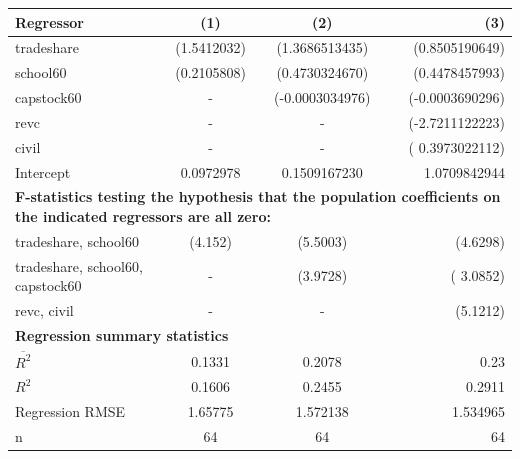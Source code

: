 \documentclass[12pt]{article}
\begin{document}
\begin{tabular}{| l | c | c |r |}
  \hline
  {\bf Regressor} & {\bf (1)} & {\bf (2)} & {\bf (3)}\\ \hline
  tradeshare & (1.5412032) & (1.3686513435) & (0.8505190649)\\ \hline
  school60 & (0.2105808) & (0.4730324670) & (0.4478457993)\\ \hline
  capstock60 & - & (-0.0003034976) & (-0.0003690296)\\ \hline
  revc & - & - & (-2.7211122223)\\ \hline
  civil & - & - & ( 0.3973022112)\\ \hline
  Intercept & 0.0972978 & 0.1509167230 & 1.0709842944 \\ \hline
  
   \multicolumn{4}{|p{15cm}|}{\bf F-statistics testing the hypothesis that the population coefficients on the indicated regressors are all zero:}  \\ \hline
  tradeshare, school60 & (4.152) & (5.5003) & (4.6298)\\ \hline
  tradeshare, school60, capstock60 & - & (3.9728) & ( 3.0852)\\ \hline
  revc, civil & - & - & (5.1212)\\ \hline
  \multicolumn{4}{|l|}{\bf Regression summary statistics}  \\ \hline
  $\overline{R^2}$  & 0.1331  & 0.2078   &0.23  \\ \hline
  $R^2$ & 0.1606 & 0.2455 &0.2911 \\ \hline
  Regression RMSE & 1.65775 & 1.572138 & 1.534965\\ \hline
  n & 64  & 64  & 64 \\ \hline
\end{tabular}
\end{document}
